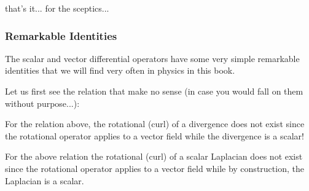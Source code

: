 	that's it... for the sceptics...
	
	\subsubsection{Remarkable Identities}\label{differential operators identities}
	The scalar and vector differential operators have some very simple remarkable identities that we will find very often in physics in this book.
	
	Let us first see the relation that make no sense (in case you would fall on them without purpose...):
	
	For the relation above, the rotational (curl) of a divergence does not exist since the rotational operator applies to a vector field while the divergence is a scalar!
	
	For the above relation the rotational (curl) of a scalar Laplacian does not exist since the rotational operator applies to a vector field while by construction, the Laplacian is a scalar.
	
